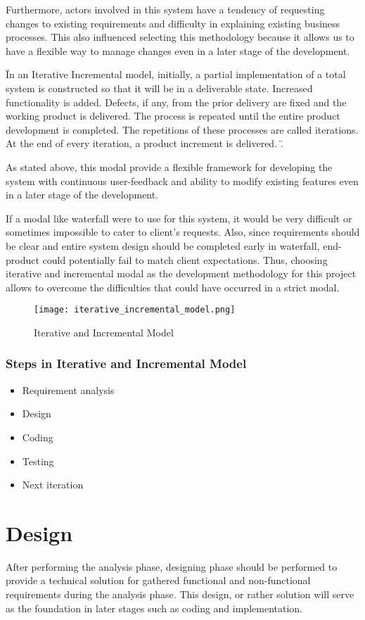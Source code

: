 \documentclass[12pt]{report}
\begin{document}
Furthermore, actors involved in this system have a tendency of requesting changes to existing requirements and difficulty in explaining existing business processes. This also influenced selecting this methodology because it allows us to have a flexible way to manage changes even in a later stage of the development.

\"In an Iterative Incremental model, initially, a partial implementation of a total system is constructed so that it will be in a deliverable state. Increased functionality is added. Defects, if any, from the prior delivery are fixed and the working product is delivered. The process is repeated until the entire product development is completed. The repetitions of these processes are called iterations. At the end of every iteration, a product increment is delivered. \cite{point_2019_sdlc}\".

As stated above, this modal provide a flexible framework for developing the system with continuous user-feedback and ability to modify existing features even in a later stage of the development.

If a modal like waterfall were to use for this system, it would be very difficult or sometimes impossible to cater to client's requests. Also, since requirements should be clear and entire system design should be completed early in waterfall, end-product could potentially fail to match client expectations. Thus, choosing iterative and incremental modal as the development methodology for this project allows to overcome the difficulties that could have occurred in a strict modal.

\begin{figure}[H]
	\centering
	\texttt{[image: iterative\_incremental\_model.png]}
	\caption{Iterative and Incremental Model}
\end{figure}

\subsection{Steps in Iterative and Incremental Model}
\begin{itemize}
	\item Requirement analysis
	\item Design
	\item Coding
	\item Testing
	\item Next iteration
\end{itemize}

\newpage
\chapter{Design}
After performing the analysis phase, designing phase should be performed to provide a technical solution for gathered functional and non-functional requirements during the analysis phase. This design, or rather solution will serve as the foundation in later stages such as coding and implementation.
\end{document}
